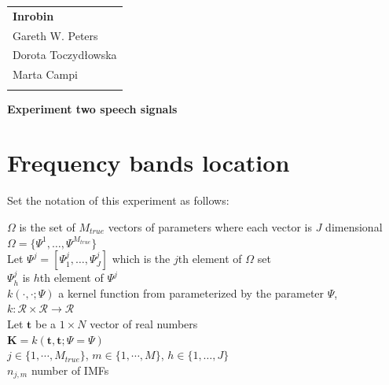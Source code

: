 \documentclass[11pt, a4paper]{article} %
\begin{document}
	
	
\setlength{\parindent}{0pt} %
\onehalfspacing				%


\begin{tabular}{p{15.5cm}}
	{\large \textbf{Inrobin}} \\
	Gareth W. Peters  \\ 
	Dorota Toczydłowska\\
	Marta Campi\\
	\hline
	\\
\end{tabular}

\vspace*{0.3cm}				%


\begin{center}
	{\LARGE \textbf{Experiment two speech signals}}
	\vspace{2mm}	
\end{center} 

\section*{Frequency bands location}
Set the notation of this experiment as follows:

$\Omega$ is the set of $M_{true}$ vectors of parameters where each vector is $J$ dimensional \\
$\Omega = \Big\{ \Psi^1, \ldots, \Psi^{M_{true}} \Big\}$\\
Let $\Psi^{j} = [\Psi^{j}_1, \ldots, \Psi^{j}_J]$ which is the $j$th element of $\Omega$ set\\
$\Psi^j_h$ is $h$th element of $\Psi^{j}$\\
$k(\cdot, \cdot;\Psi)$ a kernel function from parameterized by the parameter $\Psi$,  $k: \mathcal{R} \times \mathcal{R} \rightarrow \mathcal{R}$\\ 
Let $\mathbf{t}$ be a $1\times N$ vector of real numbers\\
$\mathbf{K} = k(\mathbf{t}, \mathbf{t};\Psi = \Psi)$\\
$j \in \Big\{ 1, \cdots, M_{true} \Big\}$, $m \in \Big\{ 1, \cdots, M \Big\}$, $h \in \Big\{1, \ldots, J \Big\}$\\ %
$n_{j,m}$ number of IMFs
\end{document}

